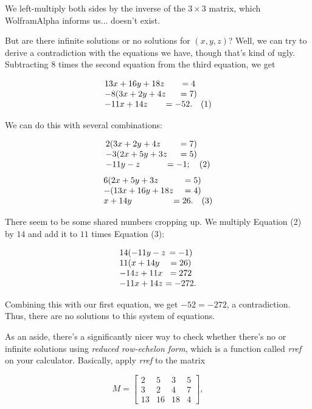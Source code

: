 \documentclass[../gatm_answers.tex]{subfiles}
\begin{document}
We left-multiply both sides by the inverse of the $3\times 3$ matrix, which WolframAlpha informs us... doesn't exist.

But are there infinite solutions or no solutions for $(x,y,z)$? Well, we can try to derive a contradiction with the equations we have, though that's kind of ugly. Subtracting $8$ times the second equation from the third equation, we get

$$\arraycolsep=0pt\begin{array}{lc}
13x+16y+18z &= 4 \\
-8( 3x + 2y + 4z &= 7) \\
-11x+14z &= -52.\quad (1) \\
\end{array}$$

We can do this with several combinations:

$$\arraycolsep=0pt\begin{array}{lc}
2(3x+2y+4z &= 7) \\
-3(2x+5y+3z &= 5) \\
-11y-z &= -1;\quad (2) \\
\end{array}$$
$$\arraycolsep=0pt\begin{array}{lc}
6(2x+5y+3z &= 5) \\
-(13x+16y+18z &= 4) \\
x+14y &= 26.\quad (3) \\
\end{array}$$

There seem to be some shared numbers cropping up. We multiply Equation (2) by $14$ and add it to $11$ times Equation (3):

$$\arraycolsep=0pt\begin{array}{lc}
14(-11y-z &= -1) \\
11(x+14y &= 26) \\
-14z+11x &= 272 \\
-11x+14z &= -272.
\end{array}$$

Combining this with our first equation, we get $-52 = -272$, a contradiction. Thus, there are no solutions to this system of equations.

As an aside, there's a significantly nicer way to check whether there's no or infinite solutions using \textit{reduced row-echelon form}, which is a function called \textit{rref} on your calculator. Basically, apply \textit{rref} to the matrix

$$M=\begin{bmatrix} 2 & 5 & 3 & 5 \\ 3 & 2 & 4 & 7 \\ 13 & 16 & 18 & 4 \end{bmatrix},$$
\end{document}
